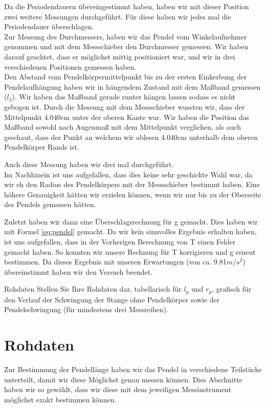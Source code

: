 \documentclass[twoside]{protokoll}
\begin{document}
Da die Periodendauern übereingestimmt haben, haben wir mit dieser Position zwei weitere Messungen durchgeführt.
Für diese haben wir jedes mal die Periodendauer überschlagen.\\

Zur Messung des Durchmessers, haben wir das Pendel vom Winkelaufnehmer genommen und mit dem Messschieber den Durchmesser gemessen.
Wir haben darauf geachtet, dass er möglichst mittig positioniert war, und wir in drei verschiedenen Positionen gemessen haben. \\

Den Abstand vom Pendelkörpermittelpunkt bis zu der ersten Einkerbung der Pendelaufhängung haben wir in hängendem Zustand mit dem Maßband gemessen ($l_3$).
Wir haben das Maßband gerade runter hängen lassen sodass es nicht gebogen ist. 
Durch die Messung mit dem Messschieber wussten wir, dass der Mittelpunkt 4.040cm unter der oberen Kante war.
Wir haben die Position das Maßband sowohl nach Augenmaß mit dem Mittelpunkt verglichen, als auch geschaut, 
dass der Punkt an welchem wir ablesen 4.040cm unterhalb dem oberen Pendelkörper Rands ist.

Auch diese Messung haben wir drei mal durchgeführt.\\
Im Nachhinein ist uns aufgefallen, dass dies keine sehr geschickte Wahl war, da wir eh den Radius des Pendelkörpers mit der Messschieber bestimmt haben.
Eine höhere Genauigkeit hätten wir erzielen können, wenn wir nur bis zu der Oberseite des Pendels gemessen hätten. 

Zuletzt haben wir dann eine Überschlagsrechnung für g gemacht. Dies haben wir mit Formel \ref{eq:pendel} gemacht.
Da wir kein sinnvolles Ergebnis erhalten haben, ist uns aufgefallen, dass in der Vorherigen Berechnung von T einen Fehler gemacht haben. 
So konnten wir unsere Rechnung für T korrigieren und g erneut bestimmen. Da dieses Ergebnis mit unseren Erwartungen (von ca. 9.81$m/s^2$) übereinstimmt haben wir den Versuch beendet.

\begin{aufgabe}{Rohdaten}
  Stellen Sie Ihre Rohdaten dar, tabellarisch für $l_p$ und $r_p$,
  grafisch für den Verlauf der Schwingung der Stange ohne Pendelkörper
  sowie der Pendelschwingung (für mindestens drei Messreihen).
\end{aufgabe}

\section{Rohdaten}
Zur Bestimmung der Pendellänge haben wir das Pendel in verschiedene Teilstücke unterteilt, damit wir diese Möglichst genau messen können. 
Dies Abschnitte haben wir so gewählt, dass wir diese mit dem jeweiligen Messinstrument möglichst exakt bestimmen können. 
\end{document}
